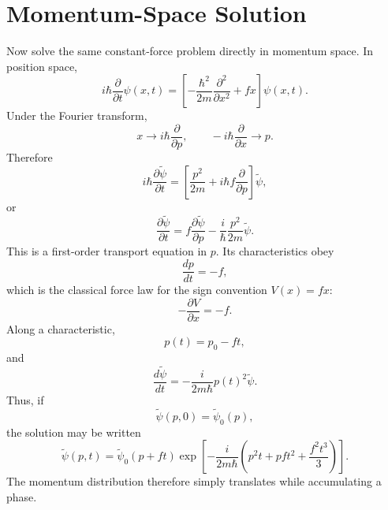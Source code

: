 \documentclass[11pt]{article}
\begin{document}
\section{Momentum-Space Solution}
Now solve the same constant-force problem directly in momentum space. In
position space,
\[
i\hbar\frac{\partial}{\partial t}\psi(x,t)
=
\left[
-\frac{\hbar^2}{2m}\frac{\partial^2}{\partial x^2}
+
fx
\right]\psi(x,t).
\]
Under the Fourier transform,
\[
x\longrightarrow i\hbar\frac{\partial}{\partial p},
\qquad
-i\hbar\frac{\partial}{\partial x}\longrightarrow p.
\]
Therefore
\[
i\hbar\frac{\partial\widetilde\psi}{\partial t}
=
\left[
\frac{p^2}{2m}
+
i\hbar f\frac{\partial}{\partial p}
\right]\widetilde\psi,
\]
or
\[
\frac{\partial\widetilde\psi}{\partial t}
=
f\frac{\partial\widetilde\psi}{\partial p}
-
\frac{i}{\hbar}\frac{p^2}{2m}\widetilde\psi.
\]
This is a first-order transport equation in $p$. Its characteristics obey
\[
\frac{dp}{dt}=-f,
\]
which is the classical force law for the sign convention $V(x)=fx$:
\[
-\frac{\partial V}{\partial x}=-f.
\]
Along a characteristic,
\[
p(t)=p_0-ft,
\]
and
\[
\frac{d\widetilde\psi}{dt}
=
-\frac{i}{2m\hbar}p(t)^2\widetilde\psi.
\]
Thus, if
\[
\widetilde\psi(p,0)=\widetilde\psi_0(p),
\]
the solution may be written
\[
\boxed{
\widetilde\psi(p,t)
=
\widetilde\psi_0(p+ft)
\exp\left[
-\frac{i}{2m\hbar}
\left(
p^2t+pft^2+\frac{f^2t^3}{3}
\right)
\right].
}
\]
The momentum distribution therefore simply translates while accumulating a
phase.
\end{document}
